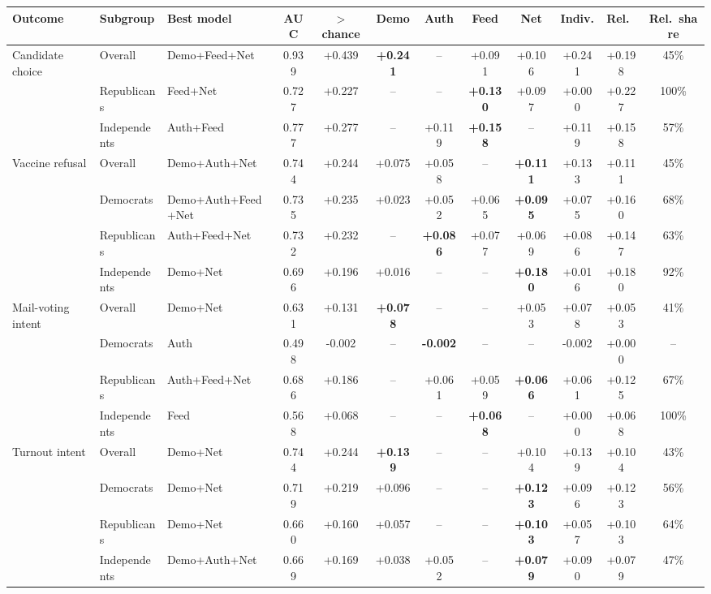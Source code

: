 \begin{tabular}{lllccccccccc}
\toprule
Outcome & Subgroup & Best model & AUC & $>$chance & Demo & Auth & Feed & Net & Indiv.\ & Rel.\ & Rel.\ share \\
\midrule
Candidate choice & Overall & Demo+\allowbreak Feed+\allowbreak Net & 0.939 & +0.439 & \textbf{+0.241} & -- & +0.091 & +0.106 & +0.241 & +0.198 & 45\% \\
 & Republicans & Feed+\allowbreak Net & 0.727 & +0.227 & -- & -- & \textbf{+0.130} & +0.097 & +0.000 & +0.227 & 100\% \\
 & Independents & Auth+\allowbreak Feed & 0.777 & +0.277 & -- & +0.119 & \textbf{+0.158} & -- & +0.119 & +0.158 & 57\% \\
Vaccine refusal & Overall & Demo+\allowbreak Auth+\allowbreak Net & 0.744 & +0.244 & +0.075 & +0.058 & -- & \textbf{+0.111} & +0.133 & +0.111 & 45\% \\
 & Democrats & Demo+\allowbreak Auth+\allowbreak Feed+\allowbreak Net & 0.735 & +0.235 & +0.023 & +0.052 & +0.065 & \textbf{+0.095} & +0.075 & +0.160 & 68\% \\
 & Republicans & Auth+\allowbreak Feed+\allowbreak Net & 0.732 & +0.232 & -- & \textbf{+0.086} & +0.077 & +0.069 & +0.086 & +0.147 & 63\% \\
 & Independents & Demo+\allowbreak Net & 0.696 & +0.196 & +0.016 & -- & -- & \textbf{+0.180} & +0.016 & +0.180 & 92\% \\
Mail-voting intent & Overall & Demo+\allowbreak Net & 0.631 & +0.131 & \textbf{+0.078} & -- & -- & +0.053 & +0.078 & +0.053 & 41\% \\
 & Democrats & Auth & 0.498 & -0.002 & -- & \textbf{-0.002} & -- & -- & -0.002 & +0.000 & -- \\
 & Republicans & Auth+\allowbreak Feed+\allowbreak Net & 0.686 & +0.186 & -- & +0.061 & +0.059 & \textbf{+0.066} & +0.061 & +0.125 & 67\% \\
 & Independents & Feed & 0.568 & +0.068 & -- & -- & \textbf{+0.068} & -- & +0.000 & +0.068 & 100\% \\
Turnout intent & Overall & Demo+\allowbreak Net & 0.744 & +0.244 & \textbf{+0.139} & -- & -- & +0.104 & +0.139 & +0.104 & 43\% \\
 & Democrats & Demo+\allowbreak Net & 0.719 & +0.219 & +0.096 & -- & -- & \textbf{+0.123} & +0.096 & +0.123 & 56\% \\
 & Republicans & Demo+\allowbreak Net & 0.660 & +0.160 & +0.057 & -- & -- & \textbf{+0.103} & +0.057 & +0.103 & 64\% \\
 & Independents & Demo+\allowbreak Auth+\allowbreak Net & 0.669 & +0.169 & +0.038 & +0.052 & -- & \textbf{+0.079} & +0.090 & +0.079 & 47\% \\
\bottomrule
\end{tabular}